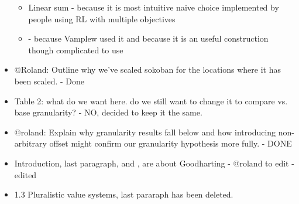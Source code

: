 \begin{itemize}
\begin{itemize}
        \item Linear sum - because it is most intuitive naive choice implemented by people using RL with multiple objectives
        \item \tloA{} - because Vamplew used it and because it is an useful construction though complicated to use
    \end{itemize}
    \item @Roland: Outline why we've scaled sokoban for the locations where it has been scaled. - Done
    \item Table 2: what do we want here. do we still want to change it to compare vs. base granularity? - NO, decided to keep it the same.
    \item @roland: Explain why granularity results fall below \tloA{} and how introducing non-arbitrary offset might confirm our granularity hypothesis more fully. - DONE
    \item Introduction, last paragraph, and , are about Goodharting - @roland to edit - edited
    \item 1.3 Pluralistic value systems, last pararaph has been deleted.
        

\end{itemize}
